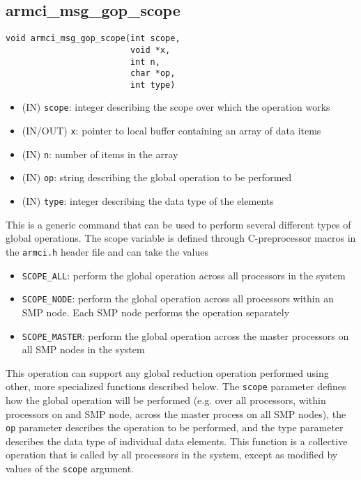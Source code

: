 \documentclass[12pt]{article}
\begin{document}
\subsection{armci\_msg\_gop\_scope}
\begin{verbatim}
void armci_msg_gop_scope(int scope,
                         void *x,
                         int n,
                         char *op,
                         int type)
\end{verbatim}
\begin{itemize}
\item (IN) \texttt{scope}: integer describing the scope over which the operation
works
\item (IN/OUT) \texttt{x}: pointer to local buffer containing an array of data items
\item (IN) \texttt{n}: number of items in the array
\item (IN) \texttt{op}: string describing the global operation to be performed
\item (IN) \texttt{type}: integer describing the data type of the elements
\end{itemize}
This is a generic command that can be used to perform several different types of
global operations. The scope variable is defined through C-preprocessor macros
in the \texttt{armci.h} header file and can take the values
\begin{itemize}
\item \texttt{SCOPE\_ALL}: perform the global operation across all processors in
the system
\item \texttt{SCOPE\_NODE}: perform the global operation across all processors
within an SMP node. Each SMP node performs the operation separately
\item \texttt{SCOPE\_MASTER}: perform the global operation across the master
processors on all SMP nodes in the system
\end{itemize}
This operation can support any global reduction operation
performed using other, more specialized functions described below. The
\texttt{scope} parameter defines how the global operation will be performed (e.g.
over all processors, within processors on and SMP node, across the master process
on all SMP nodes), the \texttt{op} parameter describes the operation to be
performed, and the type parameter describes the data type of individual data
elements. This function is a collective operation that is called by all processors
in the system, except as modified by values of the \texttt{scope} argument. 
\end{document}
